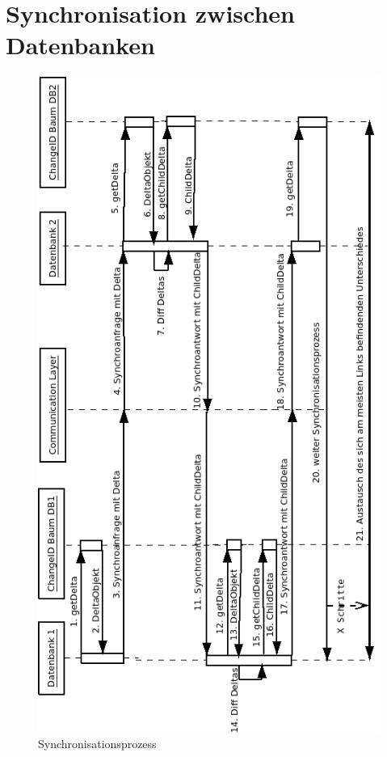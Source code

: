 \documentclass[a4paper,11pt,oneside,%
headsepline,												%
footsepline,												%
bibtotocnumbered									%
]{scrreprt}
\begin{document}
\section{Synchronisation zwischen Datenbanken}
\label{sec:eBTreeSynchronisation}
\begin{figure}[h!]
 	\centering
    \includegraphics[width=1\textwidth]{bilder/SynchroProzess.png}
    \caption{Synchronisationsprozess}
\end{figure}
\end{document}
